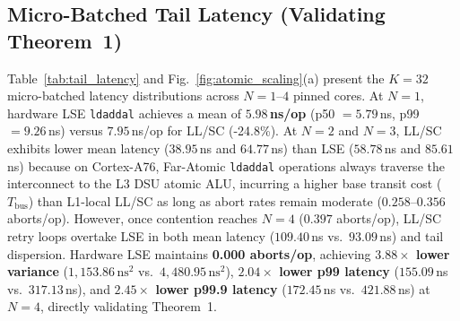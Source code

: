 \documentclass[conference]{IEEEtran}
\begin{document}
\subsection{Micro-Batched Tail Latency (Validating Theorem~1)}
Table~\ref{tab:tail_latency} and Fig.~\ref{fig:atomic_scaling}(a) present the $K=32$ micro-batched latency distributions across $N=1\text{--}4$ pinned cores. At $N=1$, hardware LSE \texttt{ldaddal} achieves a mean of \textbf{$5.98$\,ns/op} (p50 $=5.79$\,ns, p99 $=9.26$\,ns) versus $7.95$\,ns/op for LL/SC (-24.8\%). At $N=2$ and $N=3$, LL/SC exhibits lower mean latency ($38.95$\,ns and $64.77$\,ns) than LSE ($58.78$\,ns and $85.61$\,ns) because on Cortex-A76, Far-Atomic \texttt{ldaddal} operations always traverse the interconnect to the L3 DSU atomic ALU, incurring a higher base transit cost ($T_{\text{bus}}$) than L1-local LL/SC as long as abort rates remain moderate ($0.258\text{--}0.356$ aborts/op). However, once contention reaches $N=4$ ($0.397$ aborts/op), LL/SC retry loops overtake LSE in both mean latency ($109.40$\,ns vs.\ $93.09$\,ns) and tail dispersion. Hardware LSE maintains \textbf{0.000 aborts/op}, achieving \textbf{$3.88\times$ lower variance} ($1{,}153.86$\,$\text{ns}^2$ vs.\ $4{,}480.95$\,$\text{ns}^2$), \textbf{$2.04\times$ lower p99 latency} ($155.09$\,ns vs.\ $317.13$\,ns), and \textbf{$2.45\times$ lower p99.9 latency} ($172.45$\,ns vs.\ $421.88$\,ns) at $N=4$, directly validating Theorem~1.

\begin{table}[t]
\centering
\caption{Micro-Batched ($K=32$) Atomic Latency ($640{,}000$ ops/core)}
\label{tab:tail_latency}
\end{table}
\end{document}
